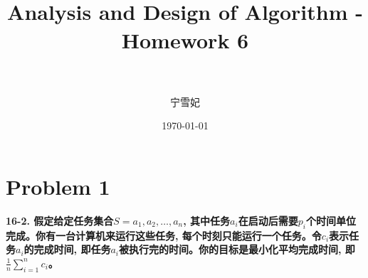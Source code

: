 \documentclass[paper=a4, fontsize=11pt]{scrartcl} %
\title{	
\normalfont \normalsize 
\horrule{0.5pt} \\[0.4cm] %
\huge Analysis and Design of Algorithm - Homework 6\\ %
\horrule{2pt} \\[0.5cm] %
}
\author{宁雪妃} %
\date{\normalsize\today} %
\numberwithin{equation}{section} %
\numberwithin{figure}{section} %
\numberwithin{table}{section} %
\begin{document}
\maketitle %


\section{Problem 1}
\textbf{16-2. 假定给定任务集合$S = {a_1, a_2, \dots, a_n}$, 其中任务$a_i$在启动后需要$p_i$个时间单位完成。你有一台计算机来运行这些任务, 每个时刻只能运行一个任务。令$c_i$表示任务$a_i$的完成时间, 即任务$a_i$被执行完的时间。你的目标是最小化平均完成时间, 即$\frac{1}{n}\sum_{i=1}^n {c_i}$。}
\end{document}
